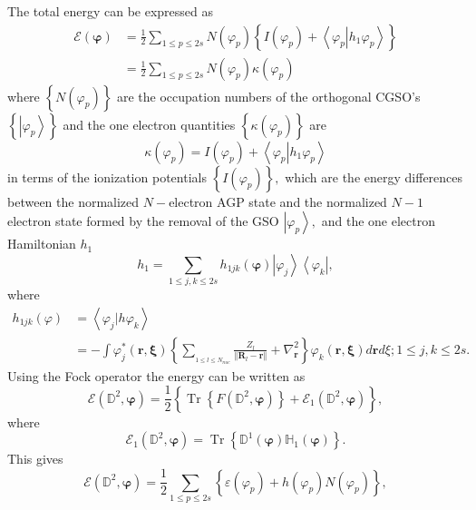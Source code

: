 \documentclass[aps,preprint]{revtex4}%
\begin{document}
The total energy can be expressed as
\begin{align*}
\mathcal{E}\left(  \mathbf{\varphi}\right)   &  =\frac{1}{2}\sum_{1\leq
p\leq2s}N\left(  \varphi_{p}\right)  \left\{  I\left(  \varphi_{p}\right)
+\left\langle \left.  \varphi_{p}\right\vert h_{1}\varphi_{p}\right\rangle
\right\} \\
&  =\frac{1}{2}%
{\textstyle\sum\limits_{1\leq p\leq2s}}
N\left(  \varphi_{p}\right)  \kappa\left(  \varphi_{p}\right)
\end{align*}
where $\left\{  N\left(  \varphi_{p}\right)  \right\}  $ are the occupation
numbers of the orthogonal CGSO's $\left\{  \left\vert \varphi_{p}\right\rangle
\right\}  $ and the one electron quantities $\left\{  \kappa\left(
\varphi_{p}\right)  \right\}  $ are
\[
\kappa\left(  \varphi_{p}\right)  =I\left(  \varphi_{p}\right)  +\left\langle
\left.  \varphi_{p}\right\vert h_{1}\varphi_{p}\right\rangle
\]
in terms of the ionization potentials $\left\{  I\left(  \varphi_{p}\right)
\right\}  ,$ which are the energy differences between the normalized
$N-$electron AGP state and the normalized $N-1$ electron state formed by the
removal of the GSO $\left\vert \varphi_{p}\right\rangle ,$ and the one
electron Hamiltonian $h_{1}$
\[
h_{1}=\sum_{1\leq j,k\leq2s}h_{1jk}\left(  \mathbf{\varphi}\right)  \left\vert
\varphi_{j}\right\rangle \left\langle \varphi_{k}\right\vert ,
\]
where
\begin{align}
h_{1jk}\left(  \varphi\right)   &  =\left\langle \varphi_{j}\left\vert
h\right.  \varphi_{k}\right\rangle \label{h1}\\
&  =-\int\varphi_{j}^{\ast}\left(  \mathbf{r,\xi}\right)  \left\{
\sum_{_{1\leq l\leq N_{nuc}}}\frac{Z_{l}}{\left\Vert \mathbf{R}_{l}%
-\mathbf{r}\right\Vert }+\nabla_{\mathbf{r}}^{2}\right\}  \varphi_{k}\left(
\mathbf{r,\xi}\right)  d\mathbf{r}d\xi;1\leq j,k\leq2s.
\end{align}
Using the Fock operator the energy can be written as
\[
\mathcal{E}\left(  \mathbb{D}^{2},\mathbf{\varphi}\right)  =\frac{1}%
{2}\left\{  \overset{}{\operatorname{Tr}\left\{  F\left(  \mathbb{D}%
^{2},\mathbf{\varphi}\right)  \right\}  +\mathcal{E}_{1}\left(  \mathbb{D}%
^{2},\mathbf{\varphi}\right)  }\right\}  ,
\]
where
\[
\mathcal{E}_{1}\left(  \mathbb{D}^{2},\mathbf{\varphi}\right)
=\operatorname{Tr}\left\{  \mathbb{D}^{1}\left(  \mathbf{\varphi}\right)
\mathbb{H}_{1}\left(  \mathbf{\varphi}\right)  \right\}  .
\]
This gives
\[
\mathcal{E}\left(  \mathbb{D}^{2},\mathbf{\varphi}\right)  =\frac{1}{2}%
\sum_{1\leq p\leq2s}\left\{  \varepsilon\left(  \varphi_{p}\right)  +h\left(
\varphi_{p}\right)  N\left(  \varphi_{p}\right)  \right\}  ,
\]
\end{document}
